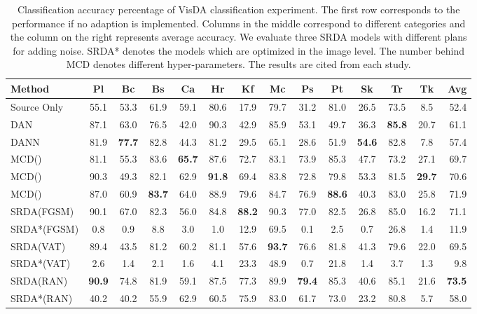 \documentclass[10pt,twocolumn,letterpaper]{article}
\begin{document}
\begin{table*}[htbp]
\centering
\caption{Classification accuracy percentage of VisDA classification experiment. The first row corresponds to the performance if no adaption is implemented. Columns in the middle correspond to different categories and the column on the right represents average accuracy. We evaluate three SRDA models with different plans for adding noise. SRDA* denotes the models which are optimized in the image level. The number behind MCD denotes different hyper-parameters. The results are cited from each study.}
\label{tab:visda}
\begin{tabular}{l|cccccccccccc|r}
\hline\hline
Method&Pl&Bc&Bs&Ca&Hr&Kf&Mc&Ps&Pt&Sk&Tr&Tk&Avg\\
\hline
Source Only&55.1&53.3 &61.9 &59.1&80.6&17.9&79.7&31.2&81.0&26.5&73.5&8.5&52.4\\
\hline
DAN~\cite{pmlr-v37-long15}&87.1&63.0&76.5&42.0&90.3&42.9&85.9&53.1&49.7&
36.3&{\bf 85.8}&20.7&61.1\\
DANN~\cite{ganin2016domain}&81.9&{\bf 77.7}&82.8&44.3&81.2&29.5&65.1&28.6&
51.9&{\bf 54.6}&82.8&7.8&57.4\\
MCD()~\cite{saito2018maximum}&81.1&55.3&83.6&{\bf 65.7}&87.6&72.7&83.1&73.9&85.3&
47.7&73.2&27.1&69.7\\
MCD()~\cite{saito2018maximum}&90.3&49.3&82.1&62.9&{\bf 91.8}&69.4&83.8&72.8&79.8&
53.3&81.5&{\bf 29.7}&70.6\\
MCD()~\cite{saito2018maximum}&87.0&60.9&{\bf 83.7}&64.0&88.9&79.6&84.7&76.9&{\bf 88.6}&
40.3&83.0&25.8&71.9\\
\hline
SRDA(FGSM)&90.1&67.0&82.3&56.0&84.8&{\bf 88.2}&90.3&77.0&
82.5&26.8&85.0&16.2&71.1\\
SRDA*(FGSM)&0.8&0.9&8.8&3.0&1.0&12.9&69.5&0.1&
2.5&0.7&26.8&1.4&11.9\\
SRDA(VAT)&89.4&43.5&81.2&60.2&81.1&57.6&{\bf 93.7}&76.6&
81.8&41.3&79.6&22.0&69.5\\
SRDA*(VAT)&2.6&1.4&2.1&1.6&4.1&23.3&48.9&0.7&
21.8&1.4&3.7&1.3&9.8\\
SRDA(RAN)&{\bf 90.9}&74.8&81.9&59.1&87.5&77.3&89.9&{\bf 79.4}&
85.3&40.6&85.1&21.6&{\bf 73.5}\\
SRDA*(RAN)&40.2&40.2&55.9&62.9&60.5&75.9&83.0&61.7&
73.0&23.2&80.8&5.7&58.0\\
\hline\hline
\end{tabular}
\end{table*}
\end{document}
